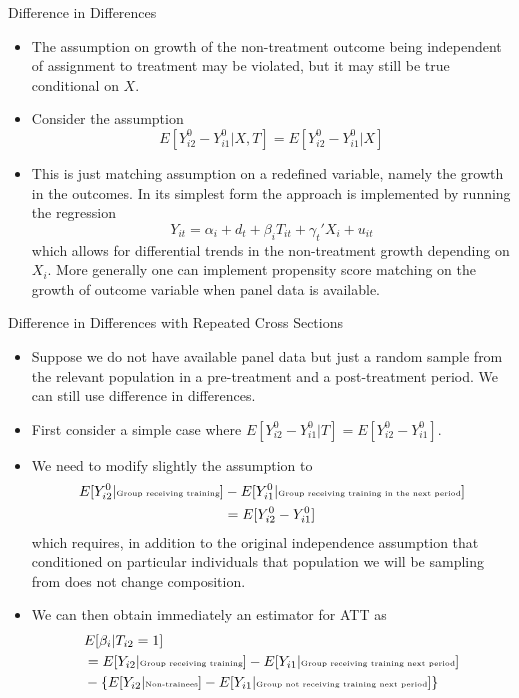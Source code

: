 \documentclass[xcolor=pdftex,dvipsnames,table,mathserif,aspectratio=169]{beamer}
\begin{document}
\begin{frame}{Difference in Differences}
\begin{itemize}
\item The assumption on growth of the non-treatment outcome being independent of assignment to treatment may be violated, but it may still be true conditional on $X$.
\item Consider the assumption
$$ E[Y_{i2}^0- Y_{i1}^0 | X,T] = E[Y_{i2}^0- Y_{i1}^0 | X] $$ 
\item This is just matching assumption on a redefined variable, namely the growth in the outcomes. In its simplest form the approach is implemented by running the regression
$$ Y_{it} = \alpha_i + d_t + \beta_i T_{it} + \gamma_t' X_i + u_{it}$$ 
which allows for differential trends in the non-treatment growth depending on $X_i$. More generally one can implement propensity score matching on the growth of outcome variable when panel data is available.
\end{itemize}
\end{frame}

\begin{frame}{Difference in Differences with Repeated Cross Sections}
\begin{itemize}
\item Suppose we do not have available panel data but just a random sample from the relevant population in a pre-treatment and a post-treatment period. We can still use difference in differences.
\item First consider a simple case where {\small $E[Y_{i2}^0- Y_{i1}^0 | T] = E[Y_{i2}^0- Y_{i1}^0]$}.
\item We need to modify slightly the assumption to
\vspace{-.5pc}
\begin{align*}
E[Y_{i2}^0| \text{\tiny Group receiving training}]&-E[Y_{i1}^0| \text{\tiny Group receiving training in the next period}] \\
&= E[Y_{i2}^0-Y_{i1}^0]  
\end{align*}
which requires, in addition to the original independence
assumption that conditioned on particular individuals that population we will be sampling from does not change composition.
\item We can then obtain immediately an estimator for ATT as
\begin{align*}
&E[\beta_i |T_{i2}=1] \\ 
&= E[Y_{i2}| \text{\tiny Group receiving training}]-E[Y_{i1}| \text{\tiny Group receiving training next period}] \\
&- \{E[Y_{i2} | \text{\tiny Non-trainees}] - E[Y_{i1} | \text{\tiny Group not receiving training next period}]\}
\end{align*}
\end{itemize}
\end{frame}
\end{document}
